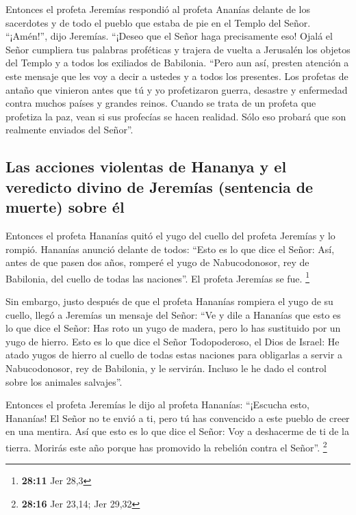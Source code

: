  Entonces el profeta Jeremías respondió al profeta Ananías
delante de los sacerdotes y de todo el pueblo que estaba de pie en el
Templo del Señor.  ``¡Amén!'', dijo Jeremías. ``¡Deseo que
el Señor haga precisamente eso! Ojalá el Señor cumpliera tus palabras
proféticas y trajera de vuelta a Jerusalén los objetos del Templo y a
todos los exiliados de Babilonia.  ``Pero aun así, presten
atención a este mensaje que les voy a decir a ustedes y a todos los
presentes.  Los profetas de antaño que vinieron antes que
tú y yo profetizaron guerra, desastre y enfermedad contra muchos países
y grandes reinos.  Cuando se trata de un profeta que
profetiza la paz, vean si sus profecías se hacen realidad. Sólo eso
probará que son realmente enviados del Señor''.

\hypertarget{las-acciones-violentas-de-hananya-y-el-veredicto-divino-de-jeremuxedas-sentencia-de-muerte-sobre-uxe9l}{%
\subsection{Las acciones violentas de Hananya y el veredicto divino de
Jeremías (sentencia de muerte) sobre
él}\label{las-acciones-violentas-de-hananya-y-el-veredicto-divino-de-jeremuxedas-sentencia-de-muerte-sobre-uxe9l}}

 Entonces el profeta Hananías quitó el yugo del cuello
del profeta Jeremías y lo rompió.  Hananías anunció
delante de todos: ``Esto es lo que dice el Señor: Así, antes de que
pasen dos años, romperé el yugo de Nabucodonosor, rey de Babilonia, del
cuello de todas las naciones''. El profeta Jeremías se fue. \footnote{\textbf{28:11}
  Jer 28,3}

 Sin embargo, justo después de que el profeta Hananías
rompiera el yugo de su cuello, llegó a Jeremías un mensaje del Señor:
 ``Ve y dile a Hananías que esto es lo que dice el Señor:
Has roto un yugo de madera, pero lo has sustituido por un yugo de
hierro.  Esto es lo que dice el Señor Todopoderoso, el
Dios de Israel: He atado yugos de hierro al cuello de todas estas
naciones para obligarlas a servir a Nabucodonosor, rey de Babilonia, y
le servirán. Incluso le he dado el control sobre los animales
salvajes''.

 Entonces el profeta Jeremías le dijo al profeta
Hananías: ``¡Escucha esto, Hananías! El Señor no te envió a ti, pero tú
has convencido a este pueblo de creer en una mentira. 
Así que esto es lo que dice el Señor: Voy a deshacerme de ti de la
tierra. Morirás este año porque has promovido la rebelión contra el
Señor''. \footnote{\textbf{28:16} Jer 23,14; Jer 29,32}

